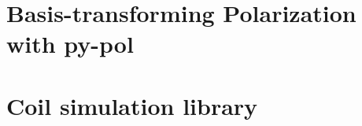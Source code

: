 \renewcommand{\imagepath}{../90-appendix/img}

\appendix
\chapter{Basis-transforming Polarization with py-pol}\label{ch:pypol_trafos}

\chapter{Coil simulation library}\label{ch:coil_simulation_library}
